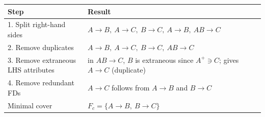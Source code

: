 \begin{center}
\renewcommand{\arraystretch}{1.35}
\begin{tabularx}{\linewidth}{@{}l >{\raggedright\arraybackslash}X@{}}
\toprule
\textbf{Step} & \textbf{Result} \\
\midrule
1. Split right-hand sides & $A\to B,\ A\to C,\ B\to C,\ A\to B,\ AB\to C$ \\
2. Remove duplicates & $A\to B,\ A\to C,\ B\to C,\ AB\to C$ \\
3. Remove extraneous LHS attributes & in $AB\to C$, $B$ is extraneous since $A^{+}\ni C$; gives $A\to C$ (duplicate) \\
4. Remove redundant FDs & $A\to C$ follows from $A\to B$ and $B\to C$ \\
\midrule
Minimal cover & $F_c = \{A\to B,\ B\to C\}$ \\
\bottomrule
\end{tabularx}
\end{center}
